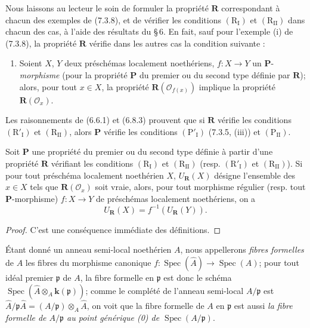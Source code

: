 \begin{remark}[7.3.11]
\label{IV.2.s7.3.11-fr}
Nous laissons au lecteur le soin de formuler la propriété $\boldsymbol R$
correspondant à chacun des exemples de (7.3.8), et de vérifier les
conditions $(\mathrm R_{\mathrm I})$ et $(\mathrm R_{\mathrm{II}})$ dans
chacun des cas, à l'aide des résultats du \S\,6. En fait, sauf pour
l'exemple (i) de (7.3.8), la propriété $\boldsymbol R$ vérifie dans les
autres cas la condition suivante :
\begin{enumerate}
\item[$(\mathrm R'_{\mathrm I})$] Soient $X$, $Y$ deux préschémas
localement noethériens, $f:X\to Y$ un $\boldsymbol P$-\emph{morphisme} (pour la
propriété $\boldsymbol P$ du premier ou du second type définie par
$\boldsymbol R$); alors, pour tout $x\in X$, la propriété
$\boldsymbol R(\mathscr O_{f(x)})$ implique la propriété
$\boldsymbol R(\mathscr O_x)$.
\end{enumerate}

Les raisonnements de (6.6.1) et (6.8.3) prouvent que si
$\boldsymbol R$ vérifie les conditions $(\mathrm R'_{\mathrm I})$ et
$(\mathrm R_{\mathrm{II}})$, alors $\boldsymbol P$ vérifie les conditions
$(\mathrm P'_{\mathrm I})$ (7.3.5, (iii)) et
$(\mathrm P_{\mathrm{II}})$.
\end{remark}

\begin{proposition}[7.3.12]
\label{IV.2.s7.3.12-fr}
Soit $\boldsymbol P$ une propriété du premier ou du second type définie à
partir d'une propriété $\boldsymbol R$ vérifiant les conditions
$(\mathrm R_{\mathrm I})$ et $(\mathrm R_{\mathrm{II}})$ \textup{(resp.}
$(\mathrm R'_{\mathrm I})$ et $(\mathrm R_{\mathrm{II}})$). Si pour tout
préschéma localement noethérien $X$, $U_{\mathbf{R}}(X)$ désigne
l'ensemble des $x\in X$ tels que $\boldsymbol R(\mathscr O_x)$ soit vraie,
alors, pour tout morphisme régulier \textup{(resp.} tout
$\boldsymbol P$-morphisme) $f:X\to Y$ de préschémas localement
noethériens, on a
\begin{equation}
U_{\mathbf{R}}(X)=f^{-1}(U_{\mathbf{R}}(Y)).
\tag{7.3.12.1}
\label{IV.2.eq.7.3.12.1-fr}
\end{equation}
\end{proposition}

\begin{proof}
C'est une conséquence immédiate des définitions.
\end{proof}

\begin{env}[7.3.13]
\label{IV.2.s7.3.13-fr}
Étant donné un anneau semi-local noethérien $A$, nous appellerons
\emph{fibres formelles} de $A$ les fibres du morphisme canonique
$f:\operatorname{Spec}(\widehat A)\to\operatorname{Spec}(A)$; pour tout
idéal premier $\mathfrak p$ de $A$, la fibre formelle en $\mathfrak p$ est
donc le schéma
$\operatorname{Spec}(\widehat A\otimes_A \boldsymbol{k}(\mathfrak p))$; comme le
complété de l'anneau semi-local $A/\mathfrak p$ est
$\widehat A/\mathfrak p\widehat A=(A/\mathfrak p)\otimes_A\widehat A$, on
voit que la fibre formelle de $A$ en $\mathfrak p$ est aussi \emph{la
fibre formelle de $A/\mathfrak p$ au point générique \textup{(0)} de
$\operatorname{Spec}(A/\mathfrak p)$}.
\end{env}

